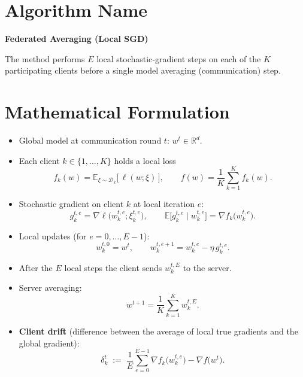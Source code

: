 \documentclass{article}
\begin{document}
\section*{Algorithm Name}
\textbf{Federated Averaging (Local SGD)}  

The method performs \(\!E\) local stochastic‑gradient steps on each of the \(K\) participating clients before a single model averaging (communication) step.

\section*{Mathematical Formulation}
\begin{itemize}
    \item Global model at communication round \(t\): \(w^{t}\in\mathbb{R}^{d}\).
    \item Each client \(k\in\{1,\dots ,K\}\) holds a local loss
          \[
          f_k(w)=\mathbb{E}_{\xi\sim\mathcal{D}_k}\big[\,\ell(w;\xi)\,\big],
          \qquad 
          f(w)=\frac1K\sum_{k=1}^{K}f_k(w).
          \]
    \item Stochastic gradient on client \(k\) at local iteration \(e\):
          \[
          g_{k}^{t,e}= \nabla\ell\!\big(w_{k}^{t,e};\xi_{k}^{t,e}\big),
          \qquad 
          \mathbb{E}\big[g_{k}^{t,e}\mid w_{k}^{t,e}\big]=\nabla f_k\!\big(w_{k}^{t,e}\big).
          \]
    \item Local updates (for \(e=0,\dots ,E-1\)):
          \[
          w_{k}^{t,0}=w^{t},\qquad 
          w_{k}^{t,e+1}=w_{k}^{t,e}-\eta\, g_{k}^{t,e}. \tag{1}
          \]
    \item After the \(E\) local steps the client sends \(w_{k}^{t,E}\) to the server.
    \item Server averaging:
          \[
          w^{t+1}= \frac1K\sum_{k=1}^{K} w_{k}^{t,E}. \tag{2}
          \]
    \item \textbf{Client drift} (difference between the average of local true gradients and the global gradient):
          \[
          \delta_{k}^{t}\;:=\;\frac1E\sum_{e=0}^{E-1}\nabla f_k\!\big(w_{k}^{t,e}\big)-\nabla f\!\big(w^{t}\big). \tag{3}
          \]
\end{itemize}
\end{document}
